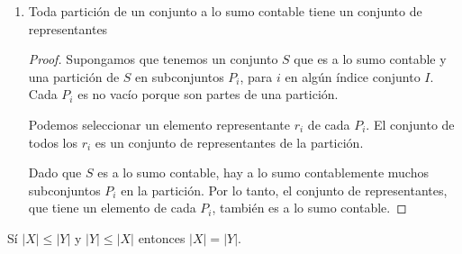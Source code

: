 \documentclass{article}
\begin{document}
\begin{enumerate}
  \item Toda partición de un conjunto a lo sumo contable tiene un conjunto de representantes\\ 
    \begin{proof}
      Supongamos que tenemos un conjunto $S$ que es a lo sumo contable y una partición de $S$ en subconjuntos $P_i$, para $i$ en algún índice conjunto $I$. Cada $P_i$ es no vacío porque son partes de una partición.

      Podemos seleccionar un elemento representante $r_i$ de cada $P_i$. El conjunto de todos los $r_i$ es un conjunto de representantes de la partición.

      Dado que $S$ es a lo sumo contable, hay a lo sumo contablemente muchos subconjuntos $P_i$ en la partición. Por lo tanto, el conjunto de representantes, que tiene un elemento de cada $P_i$, también es a lo sumo contable.
    \end{proof}
\end{enumerate}

\begin{tcolorbox}[colback=gray!7!white,colframe=green!5!black, title=Teorema Cantor-Bernstein.]
Sí $|X| \leq |Y|$ y $|Y| \leq |X|$ entonces $|X| = |Y|$. 
\end{tcolorbox}



\end{document}

